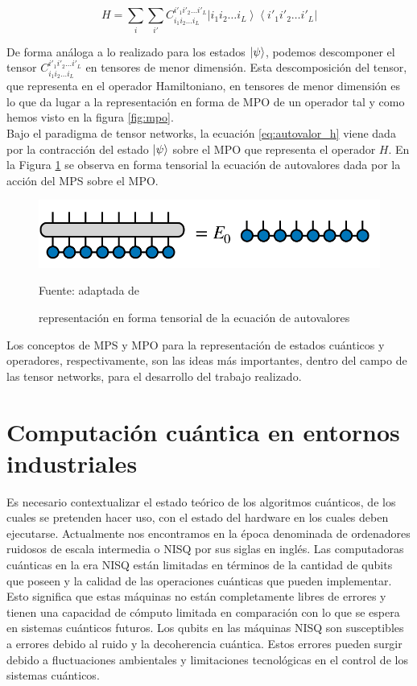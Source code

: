 \begin{equation}
    H = \sum_{i} \sum_{i'} C_{i_1 i_2 \ldots i_L}^{i'_1 i'_2 \ldots i'_L} \left| i_1 i_2 \ldots i_L \right\rangle \left\langle i'_1 i'_2 \ldots i'_L \right|
    \label{eq:operator}
\end{equation}

De forma análoga a lo realizado para los estados $\ket{\psi}$, podemos descomponer el tensor $ C_{i_1 i_2 \ldots i_L}^{i'_1 i'_2 \ldots i'_L}$ en tensores de menor dimensión. Esta descomposición del tensor, que representa en el operador Hamiltoniano, en tensores de menor dimensión es lo que da lugar a la representación en forma de MPO de un operador tal y como hemos visto en la figura \ref{fig:mpo}. \\


Bajo el paradigma de tensor networks, la ecuación \ref{eq:autovalor_h} viene dada por la contracción del estado $\ket{\psi}$ sobre el MPO que representa el operador $H$. En la Figura \ref{fig:mpo_to_mps} se observa en forma tensorial la ecuación de autovalores dada por la acción del MPS sobre el MPO.

\newpage

\begin{figure}[!ht]
    \centering
    \includegraphics[scale = 0.65]{img/03-mpo_to_mps.png}
    \caption{representación en forma tensorial de la ecuación de autovalores}
    Fuente: adaptada de \cite{tn} 
    \label{fig:mpo_to_mps}
\end{figure}

Los conceptos de MPS y MPO para la representación de estados cuánticos y operadores, respectivamente, son las ideas más importantes, dentro del campo de las tensor networks, para el desarrollo del trabajo realizado. 


\section{Computación cuántica en entornos industriales}

Es necesario contextualizar el estado teórico de los algoritmos cuánticos, de los cuales se pretenden hacer uso, con el estado del hardware en los cuales deben ejecutarse. Actualmente nos encontramos en la época denominada de ordenadores ruidosos de escala intermedia \citep{preskill} o NISQ por sus siglas en inglés. Las computadoras cuánticas en la era NISQ están limitadas en términos de la cantidad de qubits que poseen y la calidad de las operaciones cuánticas que pueden implementar. Esto significa que estas máquinas no están completamente libres de errores y tienen una capacidad de cómputo limitada en comparación con lo que se espera en sistemas cuánticos futuros. Los qubits en las máquinas NISQ son susceptibles a errores debido al ruido y la decoherencia cuántica. Estos errores pueden surgir debido a fluctuaciones ambientales y limitaciones tecnológicas en el control de los sistemas cuánticos. \\

